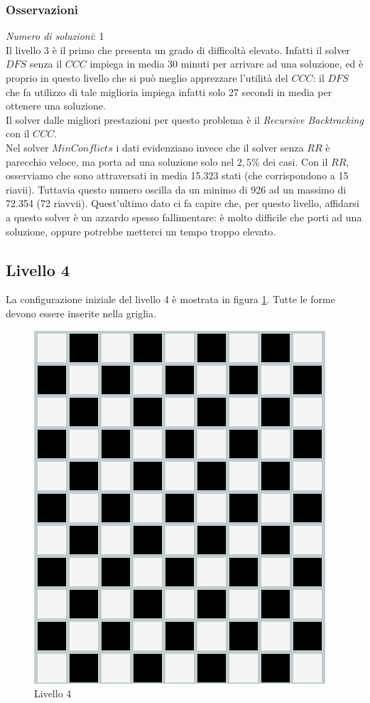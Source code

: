 \subsubsection{Osservazioni}

\textit{Numero di soluzioni}: 1\\

Il livello 3 è il primo che presenta un grado di difficoltà elevato. Infatti il solver $DFS$ senza il $CCC$ impiega in media 30 minuti per arrivare ad una soluzione, ed è proprio in questo livello che si può meglio apprezzare l'utilità del $CCC$: il $DFS$ che fa utilizzo di tale miglioria impiega infatti solo 27 secondi in media per ottenere una soluzione.\\
Il solver dalle migliori prestazioni per questo problema è il \textit{Recursive Backtracking} con il $CCC$.\\

Nel solver $MinConflicts$ i dati evidenziano invece che il solver senza $RR$ è parecchio veloce, ma porta ad una soluzione solo nel $2,5\%$ dei casi.
Con il $RR$, osserviamo che sono attraversati in media 15.323 stati (che corrispondono a 15 riavii). Tuttavia questo numero oscilla da un minimo di 926 ad un massimo di 72.354 (72 riavvii).
Quest'ultimo dato ci fa capire che, per questo livello, affidarsi a questo solver è un azzardo spesso fallimentare: è molto difficile che porti ad una soluzione, oppure potrebbe metterci un tempo troppo elevato. 
\subsection{Livello 4}
La configurazione iniziale del livello 4 è mostrata in figura \ref{lev4}. Tutte le forme devono essere inserite nella griglia.
\begin{figure}[h]
	\centering
	\includegraphics[scale=0.3]{immagini/lv4}
	\caption{Livello 4}
	\label{lev4}
\end{figure}
\\
\noindent

